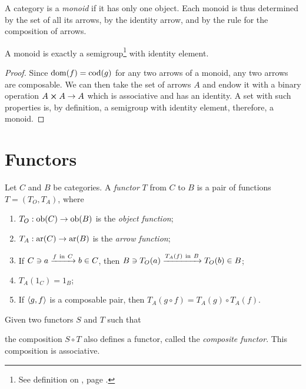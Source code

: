 \documentclass[oneside, 10pt, notitlepage]{book}
\begin{document}
\begin{definition}[Monoids]
	A category is a \emph{monoid} if it has only one object. Each monoid is
	thus determined by the set of all its arrows, by the identity arrow, and by the rule for the composition of arrows.
\end{definition}

\begin{proposition}
	A monoid is exactly a semigroup\footnote{See definition on , page \pageref{sec:groups}.} with identity element.
\end{proposition}
\begin{proof}
	Since \(\operatorname{dom}(f) = \operatorname{cod}(g) \) for any two arrows of a monoid, any two arrows are composable. We can then take the set of arrows \(A\) and endow it with a binary operation \(A\cross A \to A\) which is associative and has an identity. A set with such properties is, by definition, a semigroup with identity element, therefore, a monoid.
\end{proof}

\section{Functors}

\begin{definition}[Functors]
	Let \(C\) and \(B\) be categories. A \emph{functor} \(T\) from \(C\) to \(B\) is a pair of functions \(T=(T_O,T_A)\), where
	\begin{enumerate}
		\item \(T_O:\operatorname{ob}(C)\to\operatorname{ob}(B)\) is the \emph{object function};
		\item \(T_A:\operatorname{ar}(C)\to\operatorname{ar}(B)\) is the \emph{arrow function};
		\item If \(C\ni a\xrightarrow{f\ \text{in}\  C} b\in C\), then \(B\ni T_O(a)\xrightarrow{T_A(f)\ \text{in}\  B} T_O(b)\in B\);
		\item \(T_A(1_C) = 1_B \);
		\item If \(\left\langle g,f \right\rangle\) is a composable pair, then \(T_A(g\circ f) = T_A(g)\circ T_A(f)\).
	\end{enumerate}
\end{definition}

\begin{proposition}
	Given two functors \(S\) and \(T\) such that
	\begin{center}
	\end{center}
	the composition \(S\circ T\) also defines a functor, called the \emph{composite functor}. This composition is associative.
\end{proposition}
\end{document}

